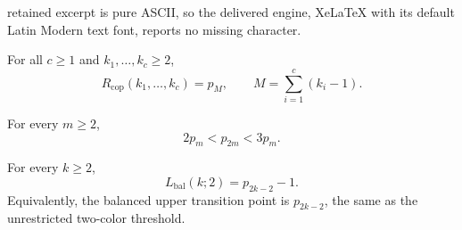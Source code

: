 \documentclass[10pt,a4paper]{amsart}
\newcommand{\Rcop}{R_{\mathrm{cop}}}
\begin{document}
retained excerpt is pure ASCII, so the delivered engine, XeLaTeX with its default Latin Modern text font, reports no missing character.
\begin{theorem}
\label{thm:main}
For all $c\ge 1$ and $k_1,\ldots,k_c\ge 2$,
\[
  \Rcop(k_1,\ldots,k_c)=p_M,
  \qquad
  M=\sum_{i=1}^c(k_i-1).
\]
\end{theorem}

\begin{lemma}
\label{lem:prime-index-gaps}
For every $m\ge2$,
\[
  2p_m<p_{2m}<3p_m .
\]
\end{lemma}

\begin{theorem}
\label{thm:balanced-exact}
For every $k\ge2$,
\[
  L_{\mathrm{bal}}(k;2)=p_{2k-2}-1.
\]
Equivalently, the balanced upper transition point is $p_{2k-2}$, the same as
the unrestricted two-color threshold.
\end{theorem}
\end{document}
